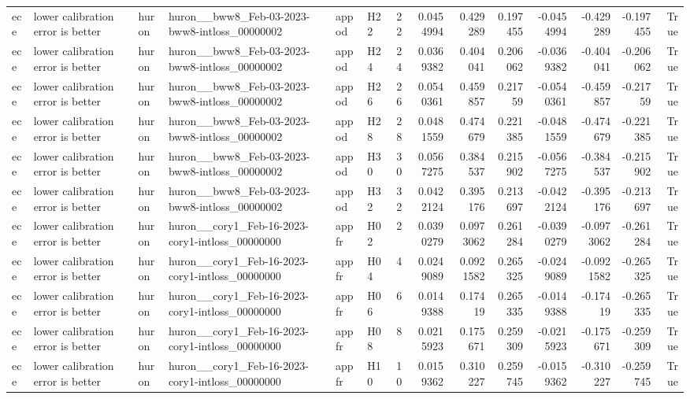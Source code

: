 \begin{longtable}{llllllrrrrrrrr}
ece & lower calibration error is better & huron & huron\_\_bww8\_Feb-03-2023-bww8-intloss\_00000002 & appod & H22 & 22 & 0.0454994 & 0.429289 & 0.197455 & -0.0454994 & -0.429289 & -0.197455 & True \\
ece & lower calibration error is better & huron & huron\_\_bww8\_Feb-03-2023-bww8-intloss\_00000002 & appod & H24 & 24 & 0.0369382 & 0.404041 & 0.206062 & -0.0369382 & -0.404041 & -0.206062 & True \\
ece & lower calibration error is better & huron & huron\_\_bww8\_Feb-03-2023-bww8-intloss\_00000002 & appod & H26 & 26 & 0.0540361 & 0.459857 & 0.21759 & -0.0540361 & -0.459857 & -0.21759 & True \\
ece & lower calibration error is better & huron & huron\_\_bww8\_Feb-03-2023-bww8-intloss\_00000002 & appod & H28 & 28 & 0.0481559 & 0.474679 & 0.221385 & -0.0481559 & -0.474679 & -0.221385 & True \\
ece & lower calibration error is better & huron & huron\_\_bww8\_Feb-03-2023-bww8-intloss\_00000002 & appod & H30 & 30 & 0.0567275 & 0.384537 & 0.215902 & -0.0567275 & -0.384537 & -0.215902 & True \\
ece & lower calibration error is better & huron & huron\_\_bww8\_Feb-03-2023-bww8-intloss\_00000002 & appod & H32 & 32 & 0.0422124 & 0.395176 & 0.213697 & -0.0422124 & -0.395176 & -0.213697 & True \\
ece & lower calibration error is better & huron & huron\_\_cory1\_Feb-16-2023-cory1-intloss\_00000000 & appfr & H02 & 2 & 0.0390279 & 0.0973062 & 0.261284 & -0.0390279 & -0.0973062 & -0.261284 & True \\
ece & lower calibration error is better & huron & huron\_\_cory1\_Feb-16-2023-cory1-intloss\_00000000 & appfr & H04 & 4 & 0.0249089 & 0.0921582 & 0.265325 & -0.0249089 & -0.0921582 & -0.265325 & True \\
ece & lower calibration error is better & huron & huron\_\_cory1\_Feb-16-2023-cory1-intloss\_00000000 & appfr & H06 & 6 & 0.0149388 & 0.17419 & 0.265335 & -0.0149388 & -0.17419 & -0.265335 & True \\
ece & lower calibration error is better & huron & huron\_\_cory1\_Feb-16-2023-cory1-intloss\_00000000 & appfr & H08 & 8 & 0.0215923 & 0.175671 & 0.259309 & -0.0215923 & -0.175671 & -0.259309 & True \\
ece & lower calibration error is better & huron & huron\_\_cory1\_Feb-16-2023-cory1-intloss\_00000000 & appfr & H10 & 10 & 0.0159362 & 0.310227 & 0.259745 & -0.0159362 & -0.310227 & -0.259745 & True \\

\end{longtable}
